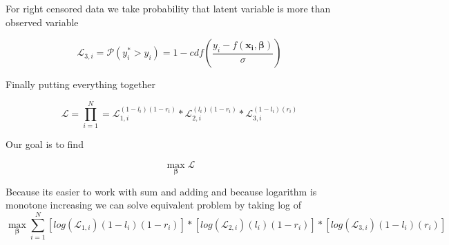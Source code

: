 \documentclass[11pt]{article}
\begin{document}
    For right censored data we take probability that latent variable is more than observed variable

    \begin{equation}
        \mathcal{L}_{3,i} = \mathcal{P}(y^*_i > y_i) = 1 - cdf(\frac{y_i - f(\boldsymbol{x_i},\boldsymbol{\beta})}{\sigma})
    \end{equation}

    Finally putting everything together

    \begin{equation}
    \mathcal{L} = \prod_{i=1}^N = \mathcal{L}_{1,i}^{(1-l_i)(1-r_i)} * \mathcal{L}_{2,i}^{(l_i)(1-r_i)} * \mathcal{L}_{3,i}^{(1-l_i)(r_i)}
    \end{equation}

    Our goal is to find

    \begin{equation}
    \max_{\boldsymbol{\beta}} \mathcal{L}
    \end{equation}

    Because its easier to work with sum and adding and because logarithm is monotone increasing we can solve equivalent problem by taking log of 
    \begin{equation}
       \max_{\boldsymbol{\beta}}  \sum_{i=1}^N  \left[  log(\mathcal{L}_{1,i}){(1-l_i)(1-r_i)} \right]* \left[log(\mathcal{L}_{2,i}){(l_i)(1-r_i)} \right] * \left[log(\mathcal{L}_{3,i}){(1-l_i)(r_i)} \right]
    \end{equation}
\end{document}
